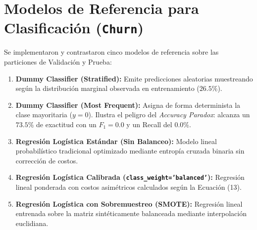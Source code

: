 \documentclass[11pt,letterpaper]{article}
\begin{document}
\section{Modelos de Referencia para Clasificación (\texttt{Churn})}

Se implementaron y contrastaron cinco modelos de referencia sobre las particiones de Validación y Prueba:
\begin{enumerate}
    \item \textbf{Dummy Classifier (Stratified):} Emite predicciones aleatorias muestreando según la distribución marginal observada en entrenamiento ($26.5\%$).
    \item \textbf{Dummy Classifier (Most Frequent):} Asigna de forma determinista la clase mayoritaria ($y=0$). Ilustra el peligro del \textit{Accuracy Paradox}: alcanza un $73.5\%$ de exactitud con un $F_1 = 0.0$ y un Recall del $0.0\%$.
    \item \textbf{Regresión Logística Estándar (Sin Balanceo):} Modelo lineal probabilístico tradicional optimizado mediante entropía cruzada binaria sin corrección de costos.
    \item \textbf{Regresión Logística Calibrada (\texttt{class\_weight='balanced'}):} Regresión lineal ponderada con costos asimétricos calculados según la Ecuación (13).
    \item \textbf{Regresión Logística con Sobremuestreo (SMOTE):} Regresión lineal entrenada sobre la matriz sintéticamente balanceada mediante interpolación euclidiana.
\end{enumerate}
\end{document}
